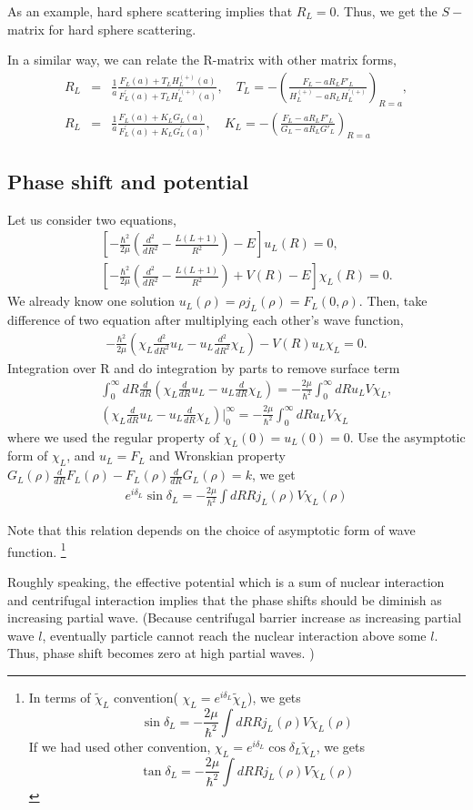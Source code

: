 \documentclass[10pt]{book}
\newcommand{\bea}{\begin{eqnarray}}
\newcommand{\eea}{\end{eqnarray}}
\newcommand{\no}{\nonumber \\}
\begin{document}
As an example, hard sphere scattering implies that $R_L=0$. Thus, we get the $S-$matrix
for hard sphere scattering.  

In a similar way, we can relate the R-matrix with other matrix forms,
\bea 
R_L&=&\frac{1}{a}\frac{F_L(a)+T_L H_L^{(+)}(a)}{F_L^{'}(a)+T_L H_L^{'(+)}(a)},
\quad T_L=-\left(\frac{F_L-aR_LF'_L}{H_L^{(+)}-a R_L H_L^{'(+)}} \right)_{R=a} ,\no 
R_L&=&\frac{1}{a}\frac{F_L(a)+K_L G_L(a)}{F_L^{'}(a)+K_L G_L^{'}(a)}, \quad 
 K_L=-\left(\frac{F_L-aR_LF'_L}{G_L-a R_L G'_L} \right)_{R=a}
\eea 

    
\subsection{Phase shift and potential}
Let us consider two equations,
\bea 
& &\left[-\frac{\hbar^2}{2\mu}\left( \frac{d^2}{dR^2}-\frac{L(L+1)}{R^2}\right)
    -E\right]u_L(R)=0,\no 
& &\left[-\frac{\hbar^2}{2\mu}\left( \frac{d^2}{dR^2}-\frac{L(L+1)}{R^2}\right)
    +V(R)-E\right]\chi_L(R)=0.
\eea 
We already know one solution $u_L(\rho)=\rho j_L(\rho)=F_L(0,\rho)$. Then, take
difference of two equation after multiplying each other's wave function,
\bea 
-\frac{\hbar^2}{2\mu}\left(\chi_L \frac{d^2}{dR^2} u_L- u_L\frac{d^2}{dR^2} \chi_L \right) 
-V(R)u_L\chi_L=0.
\eea 
Integration over R and do integration by parts to remove surface term
\bea 
& &\int_0^\infty dR \frac{d}{dR} \left(\chi_L \frac{d}{dR} u_L- u_L\frac{d}{dR} \chi_L \right)
=-\frac{2\mu}{\hbar^2}\int_0^\infty dR u_L V \chi_L, \no 
& &\left(\chi_L \frac{d}{dR} u_L- u_L\frac{d}{dR} \chi_L \right)\Big|^\infty_0  
=-\frac{2\mu}{\hbar^2}\int_0^\infty dR u_L V \chi_L
\eea 
where we used the regular property of $\chi_L(0)=u_L(0)=0$.
Use the asymptotic form of $\chi_L$, and $u_L=F_L$
and Wronskian property $G_L(\rho)\frac{d}{dR}F_L(\rho)-F_L(\rho)\frac{d}{dR}G_L(\rho)=k$,
we get
\bea 
e^{i\delta_L}\sin\delta_L 
=-\frac{2\mu}{\hbar^2}\int dR R j_L(\rho) V \chi_L(\rho)
\eea 

Note that this relation depends on the choice of asymptotic form of wave function.
\footnote{ 
In terms of $\tilde{\chi}_L$ convention( $\chi_L= e^{i\delta_L}\tilde{\chi}_L$), we gets
$$\sin\delta_L =-\frac{2\mu}{\hbar^2}\int dR R j_L(\rho) V \tilde{\chi}_L(\rho)$$
If we had used other convention, $\chi_L= e^{i\delta_L}\cos\delta_L\tilde{\chi}_L$, we gets
$$\tan\delta_L =-\frac{2\mu}{\hbar^2}\int dR R j_L(\rho) V \tilde{\chi}_L(\rho)$$
} 

Roughly speaking, the effective potential which is a sum of nuclear interaction and centrifugal interaction
implies that the phase shifts should be diminish as increasing partial wave. (Because centrifugal barrier 
increase as increasing partial wave $l$, eventually particle cannot reach the nuclear interaction
above some $l$. Thus, phase shift becomes zero at high partial waves. )
\end{document}
